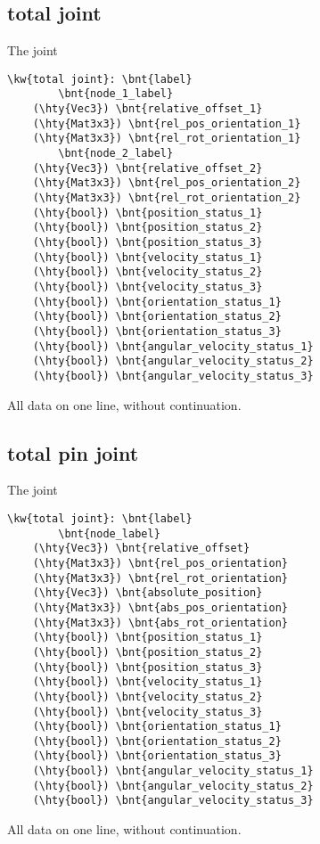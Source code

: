\subsection{total joint}
The  joint
\begin{Verbatim}[commandchars=\\\{\}]
    \kw{total joint}: \bnt{label}
        \bnt{node_1_label} 
	(\hty{Vec3}) \bnt{relative_offset_1}
	(\hty{Mat3x3}) \bnt{rel_pos_orientation_1}
	(\hty{Mat3x3}) \bnt{rel_rot_orientation_1}
        \bnt{node_2_label} 
	(\hty{Vec3}) \bnt{relative_offset_2}
	(\hty{Mat3x3}) \bnt{rel_pos_orientation_2}
	(\hty{Mat3x3}) \bnt{rel_rot_orientation_2}
	(\hty{bool}) \bnt{position_status_1}
	(\hty{bool}) \bnt{position_status_2}
	(\hty{bool}) \bnt{position_status_3}
	(\hty{bool}) \bnt{velocity_status_1}
	(\hty{bool}) \bnt{velocity_status_2}
	(\hty{bool}) \bnt{velocity_status_3}
	(\hty{bool}) \bnt{orientation_status_1}
	(\hty{bool}) \bnt{orientation_status_2}
	(\hty{bool}) \bnt{orientation_status_3}
	(\hty{bool}) \bnt{angular_velocity_status_1}
	(\hty{bool}) \bnt{angular_velocity_status_2}
	(\hty{bool}) \bnt{angular_velocity_status_3}
\end{Verbatim}
All data on one line, without continuation.

\subsection{total pin joint}
The  joint
\begin{Verbatim}[commandchars=\\\{\}]
    \kw{total joint}: \bnt{label}
        \bnt{node_label} 
	(\hty{Vec3}) \bnt{relative_offset}
	(\hty{Mat3x3}) \bnt{rel_pos_orientation}
	(\hty{Mat3x3}) \bnt{rel_rot_orientation}
	(\hty{Vec3}) \bnt{absolute_position}
	(\hty{Mat3x3}) \bnt{abs_pos_orientation}
	(\hty{Mat3x3}) \bnt{abs_rot_orientation}
	(\hty{bool}) \bnt{position_status_1}
	(\hty{bool}) \bnt{position_status_2}
	(\hty{bool}) \bnt{position_status_3}
	(\hty{bool}) \bnt{velocity_status_1}
	(\hty{bool}) \bnt{velocity_status_2}
	(\hty{bool}) \bnt{velocity_status_3}
	(\hty{bool}) \bnt{orientation_status_1}
	(\hty{bool}) \bnt{orientation_status_2}
	(\hty{bool}) \bnt{orientation_status_3}
	(\hty{bool}) \bnt{angular_velocity_status_1}
	(\hty{bool}) \bnt{angular_velocity_status_2}
	(\hty{bool}) \bnt{angular_velocity_status_3}
\end{Verbatim}
All data on one line, without continuation.


